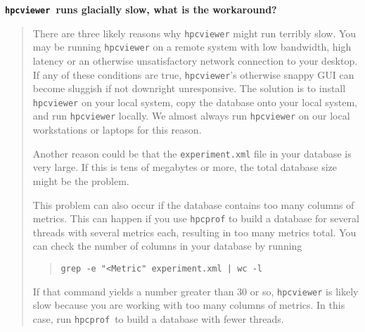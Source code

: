 \documentclass{article}
\newcommand{\hpcprof}{\texttt{hpcprof}}
\newcommand{\hpcviewer}{\texttt{hpcviewer}}
\begin{document}
\textbf{\hpcviewer\ runs glacially slow, what is the workaround?}
\begin{quote}
There are three likely reasons why \hpcviewer{} might run terribly
slow.  You may be running \hpcviewer{} on a remote system with low
bandwidth, high latency or an otherwise unsatisfactory network
connection to your desktop. If any of these conditions are true,
\hpcviewer{}'s otherwise snappy GUI can become sluggish if not
downright unresponsive.  The solution is to install \hpcviewer{} on
your local system, copy the database onto your local system, and run
\hpcviewer{} locally. We almost always run \hpcviewer{} on our local
workstations or laptops for this reason.

Another reason could be that the {\tt experiment.xml} file in your
database is very large.  If this is tens of megabytes or more, the
total database size might be the problem.

This problem can also occur if the database contains too many columns
of metrics.  This can happen if you use \hpcprof{} to build a database
for several threads with several metrics each, resulting in too many
metrics total. You can check the number of columns in your database by
running
\begin{quote}
\verb,grep -e "<Metric" experiment.xml | wc -l,
\end{quote}
If that command yields a number greater than 30 or so, \hpcviewer{} is
likely slow because you are working with too many columns of metrics.
In this case, run \hpcprof\ to build a database with fewer threads.
\end{quote}
\end{document}
